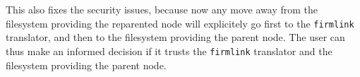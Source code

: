 This also fixes the security issues, because now any move away from
the filesystem providing the reparented node will explicitely go first
to the \texttt{firmlink} translator, and then to the filesystem
providing the parent node.  The user can thus make an informed
decision if it trusts the \texttt{firmlink} translator and the
filesystem providing the parent node.

\begin{comment}
  This is a good example where the redesign of the IPC system forces
  us to fix a security issue and provides a deeper insight into the
  trust issues and how to solve them.
\end{comment}


